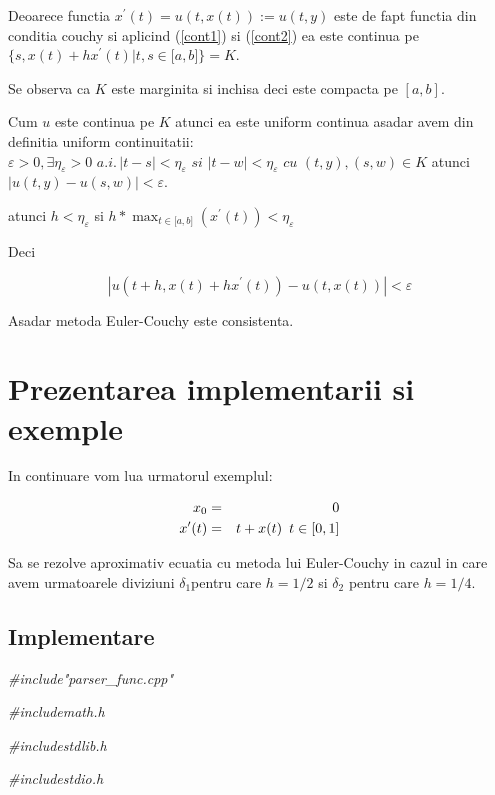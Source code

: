 \documentclass[a4paper,twoside]{book}
\begin{document}
Deoarece functia $x^{\prime }(t)=u(t,x(t)):=u(t,y)$ este de fapt functia din
conditia couchy si aplicind (\ref{cont1}) si (\ref{cont2}) ea este continua
pe $\{s,x(t)+hx^{\prime }(t)|t,s\in \lbrack a,b]\}=K$.

Se observa ca $K$ este marginita si inchisa deci este compacta pe $[a,b]$.

Cum $u$ este continua pe $K$ atunci ea este uniform continua asadar avem din
definitia uniform continuitatii: \thinspace $\varepsilon >0,\exists \eta
_{\varepsilon }>0\,\,a.i.\,|t-s|<\eta _{\varepsilon }\,\,si\,\,|t-w|<\eta
_{\varepsilon }\,\,cu\,\,(t,y),(s,w)\in K$ atunci $\left\vert
u(t,y)-u(s,w)\right\vert <\varepsilon $.

atunci $h<\eta _{\varepsilon }$ si $h\ast \max_{t\in \lbrack a,b]}(x^{\prime
}(t))<\eta _{\varepsilon }$

Deci

\begin{equation*}
\left\vert u(t+h,x(t)+hx^{\prime }(t))-u(t,x(t))\right\vert <\varepsilon
\end{equation*}

Asadar metoda Euler-Couchy este consistenta.

\section{Prezentarea implementarii si exemple}

In continuare vom lua urmatorul exemplul:

\begin{eqnarray*}
x_{0} &=&0 \\
x^{\prime }(t) &=&t+x(t)\text{\thinspace \thinspace \thinspace }t\in \lbrack
0,1]
\end{eqnarray*}

Sa se rezolve aproximativ ecuatia cu metoda lui Euler-Couchy in cazul in
care avem urmatoarele diviziuni $\delta _{1}$pentru care $h=1/2$ si $\delta
_{2}$ pentru care $h=1/4$.

\subsection{Implementare}

\textit{\#include"parser\_func.cpp"}

\textit{\#include\TEXTsymbol{<}math.h\TEXTsymbol{>}}

\textit{\#include\TEXTsymbol{<}stdlib.h\TEXTsymbol{>}}

\textit{\#include\TEXTsymbol{<}stdio.h\TEXTsymbol{>}}
\end{document}
